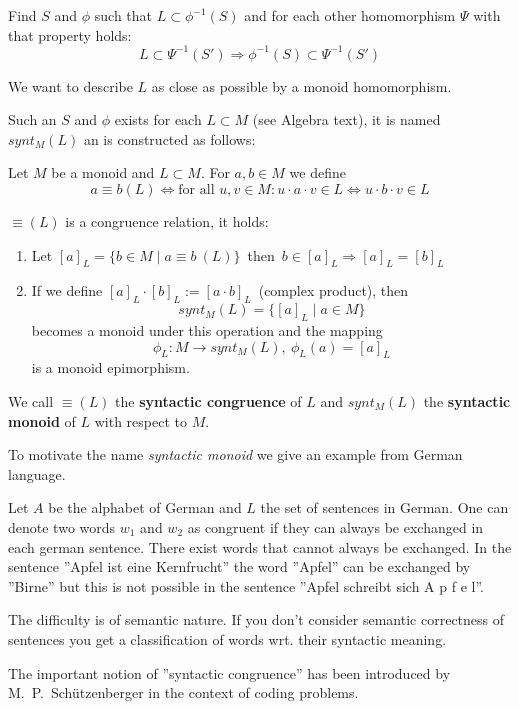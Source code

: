 Find $S$ and $\phi$ such that $L \subset \phi^{-1}(S)$ and for each other
homomorphism $\Psi$ with that property holds:
\[ L \subset \Psi^{-1}(S') \Rightarrow \phi^{-1}(S) \subset \Psi^{-1}(S') \]

We want to describe $L$ as close as possible by a monoid homomorphism.

Such an $S$ and $\phi$ exists for each $L \subset M$ (see Algebra text), it is
named $synt_M(L)$ an is constructed as follows:

\begin{definition}
Let $M$ be a monoid and $L \subset M$. For $a, b \in M$ we define
\[ a \equiv b (L) \iff \text{for all }u, v \in M: u \cdot a \cdot v \in L
\Leftrightarrow u \cdot b \cdot v \in L \]
\end{definition}

$\equiv (L)$ is a congruence relation, it holds:
\begin{enumerate}
  \item Let $[a]_L = \{ b \in M \mid a \equiv b\ (L) \}$\ then\ $b \in [a]_L
  \Rightarrow [a]_L = [b]_L $
  \item If we define $[a]_L \cdot [b]_L := [a \cdot b]_L$\ (complex product),
  then \[synt_M(L) = \{ [a]_L \mid a \in M \}\] becomes a monoid under this
  operation and the mapping \[\phi_L : M \to synt_M(L),\ \phi_L(a) = [a]_L\]
   is a monoid epimorphism.
\end{enumerate}

We call $\equiv (L)$ the {\bf syntactic congruence} of $L$ and $synt_M(L)$ the
{\bf syntactic monoid} of $L$ with respect to $M$.

To motivate the name {\em syntactic monoid} we give an example from German
language.

Let $A$ be the alphabet of German and $L$ the set of sentences in German. One can
denote two words $w_1$ and $w_2$ as congruent if they can always be exchanged in
each german sentence. There exist words that cannot always be exchanged. In the
sentence ''Apfel ist eine Kernfrucht'' the word ''Apfel'' can be exchanged by
''Birne'' but this is not possible in the sentence ''Apfel schreibt sich A p f e
l''.

The difficulty is of semantic nature. If you don't consider semantic correctness
of sentences you get a classification of words wrt. their syntactic meaning.


The important notion of ''syntactic congruence'' has been introduced by M.\ P.\
Schützenberger in the context of coding problems.

